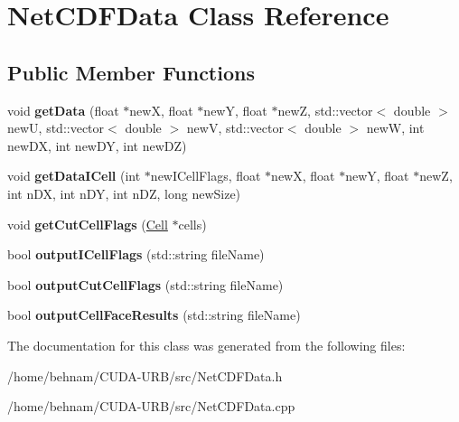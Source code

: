 \hypertarget{classNetCDFData}{}\section{Net\+C\+D\+F\+Data Class Reference}
\label{classNetCDFData}
\subsection*{Public Member Functions}
\begin{DoxyCompactItemize}
\item 
\mbox{\label{classNetCDFData_a83a87e21aaf7a6b8832f703cb2428397}} 
void {\bfseries get\+Data} (float $\ast$newX, float $\ast$newY, float $\ast$newZ, std\+::vector$<$ double $>$ newU, std\+::vector$<$ double $>$ newV, std\+::vector$<$ double $>$ newW, int new\+DX, int new\+DY, int new\+DZ)
\item 
\mbox{\label{classNetCDFData_a529a0cd09c197f3315fb2b13ac37c093}} 
void {\bfseries get\+Data\+I\+Cell} (int $\ast$new\+I\+Cell\+Flags, float $\ast$newX, float $\ast$newY, float $\ast$newZ, int n\+DX, int n\+DY, int n\+DZ, long new\+Size)
\item 
\mbox{\label{classNetCDFData_a42691a22e2c7b0f1e229b5c2c778de79}} 
void {\bfseries get\+Cut\+Cell\+Flags} (\hyperlink{classCell}{Cell} $\ast$cells)
\item 
\mbox{\label{classNetCDFData_aa5dd60d0acf7db3857a9fda54d6245d6}} 
bool {\bfseries output\+I\+Cell\+Flags} (std\+::string file\+Name)
\item 
\mbox{\label{classNetCDFData_ac883d61608e3d51a6ec9f2e10e061e13}} 
bool {\bfseries output\+Cut\+Cell\+Flags} (std\+::string file\+Name)
\item 
\mbox{\label{classNetCDFData_a859f33b4e381915183651dfb4eef4975}} 
bool {\bfseries output\+Cell\+Face\+Results} (std\+::string file\+Name)
\end{DoxyCompactItemize}


The documentation for this class was generated from the following files\+:\begin{DoxyCompactItemize}
\item 
/home/behnam/\+C\+U\+D\+A-\/\+U\+R\+B/src/Net\+C\+D\+F\+Data.\+h\item 
/home/behnam/\+C\+U\+D\+A-\/\+U\+R\+B/src/Net\+C\+D\+F\+Data.\+cpp\end{DoxyCompactItemize}
